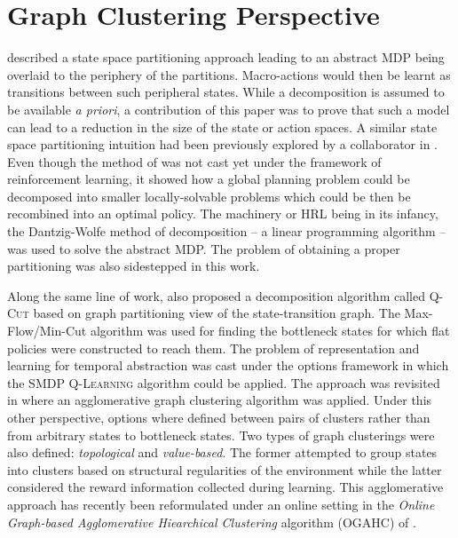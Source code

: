 \section{Graph Clustering Perspective}
\cite{Hauskrecht1998} described a state space partitioning
approach leading to an abstract MDP being overlaid to the periphery of the partitions.
Macro-actions would then be learnt as transitions between such peripheral
states. While a decomposition is assumed to be available \textit{a priori}, a contribution of this paper was to prove that such a model can lead to a reduction in the size of the state or action spaces. A similar state space partitioning intuition had been previously explored by a collaborator in \cite{Dean1995}. Even though the method of \cite{Dean1995} was not cast yet under the framework of
reinforcement learning, it showed how a global planning problem could be decomposed into
smaller locally-solvable problems which could be then be recombined into an optimal policy.
The machinery or HRL being in its infancy, the Dantzig-Wolfe method of decomposition \parencite{Dantzig1960} -- a linear programming algorithm -- was used to solve the abstract MDP. The problem of obtaining a proper partitioning was also sidestepped in this work.

Along the same line of work, \cite{Menache2002} also proposed a decomposition algorithm called \textsc{Q-Cut} based on graph partitioning view of the state-transition graph. The Max-Flow/Min-Cut algorithm was used for finding the bottleneck states for which flat policies were constructed to reach them. The problem of representation and learning for temporal abstraction was cast under the options framework \parencite{Sutton1999} in which the \textsc{SMDP Q-Learning} algorithm could be applied. The approach was revisited in \cite{Mannor2004} where an agglomerative graph clustering algorithm was applied. Under this other perspective, options where defined between pairs of clusters rather than from arbitrary states to bottleneck states. Two types of graph clusterings were also defined: \textit{topological} and \textit{value-based}. The former attempted to group states into clusters based on structural regularities of the environment while the latter considered the reward information collected during learning.
This agglomerative approach has recently been reformulated under an online setting in the \textit{Online Graph-based Agglomerative Hiearchical Clustering} algorithm (\textsc{OGAHC}) of \cite{Metzen2012}.

